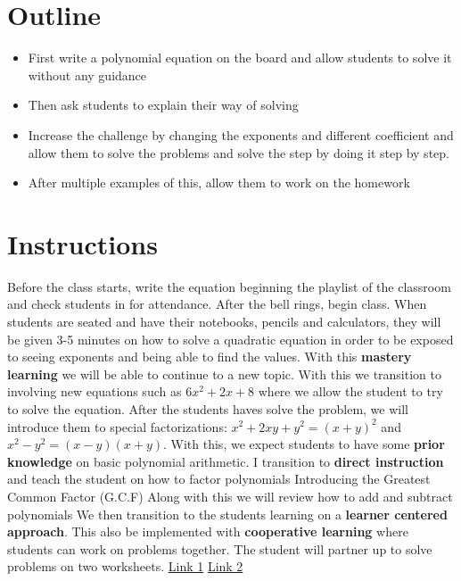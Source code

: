 \section{Outline}

\begin{itemize}
    \item First write a polynomial equation on the board and allow students to solve it without any guidance
    \item Then ask students to explain their way of solving
    \item Increase the challenge by changing the exponents and different coefficient and allow them to solve the problems and solve the step by doing it step by step.
    \item After multiple examples of this, allow them to work on the homework
\end{itemize}

\section{Instructions}

\begin{outline}
    \1 Before the class starts, write the equation beginning the playlist of the classroom and check students in for attendance. After the bell rings, begin class.
    \1 When students are seated and have their notebooks, pencils and calculators, they will be given 3-5 minutes on how to solve a quadratic equation in order to be exposed to seeing exponents and being able to find the values. With this \textbf{mastery learning} we will be able to continue to a new topic.
    \1 With this we transition to involving new equations such as $6x^2+2x+8$ where we allow the student to try to solve the equation.
    \1 After the students haves solve the problem, we will introduce them to special factorizations: $x^2+2xy+y^2 = (x+y)^2$ and $x^2-y^2 = (x-y)(x+y)$.
    \1 With this, we expect students to have some \textbf{prior knowledge} on basic polynomial arithmetic. 
    \1 I transition to \textbf{direct instruction} and teach the student on how to factor polynomials
        \2 Introducing the Greatest Common Factor (G.C.F)
        \2 Along with this we will review how to add and subtract polynomials
    \1 We then transition to the students learning on a \textbf{learner centered approach}. This also be implemented with \textbf{cooperative learning} where students can work on problems together.
    \1 The student will partner up to solve problems on two worksheets.
        \2 \href{https://mathmonks.com/wp-content/uploads/2022/02/College-Algebra-Factoring-Polynomials-Worksheet.jpg}{Link 1}
        \2 \href{https://mathmonks.com/wp-content/uploads/2022/02/Factoring-Out-GCF-of-Polynomials-Worksheet.jpg}{Link 2}
\end{outline}